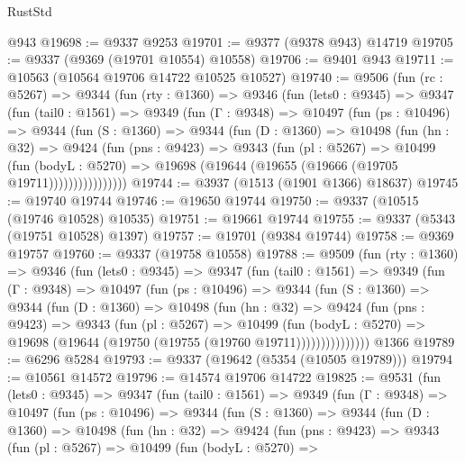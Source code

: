 \begin{lexlean}{RustStd}
\begin{coremodule}
    @943
@19698 := @9337 @9253
@19701 := @9377 (@9378 @943) @14719
@19705 := @9337 (@9369 (@19701 @10554) @10558)
@19706 := @9401 @943
@19711 := @10563 (@10564 @19706 @14722 @10525 @10527)
@19740 := @9506
    (fun (rc : @5267) =>
    @9344
      (fun (rty : @1360) =>
      @9346
        (fun (lets0 : @9345) =>
        @9347
          (fun (tail0 : @1561) =>
          @9349
            (fun (Γ : @9348) =>
            @10497
              (fun (ps : @10496) =>
              @9344
                (fun (S : @1360) =>
                @9344
                  (fun (D : @1360) =>
                  @10498
                    (fun (hn : @32) =>
                    @9424
                      (fun (pns : @9423) =>
                      @9343
                        (fun (pl : @5267) =>
                        @10499
                          (fun (bodyL : @5270) =>
                          @19698 (@19644 (@19655 (@19666 (@19705 @19711))))))))))))))))
@19744 := @3937 (@1513 (@1901 @1366) @18637)
@19745 := @19740 @19744
@19746 := @19650 @19744
@19750 := @9337 (@10515 (@19746 @10528) @10535)
@19751 := @19661 @19744
@19755 := @9337 (@5343 (@19751 @10528) @1397)
@19757 := @19701 (@9384 @19744)
@19758 := @9369 @19757
@19760 := @9337 (@19758 @10558)
@19788 := @9509
    (fun (rty : @1360) =>
    @9346
      (fun (lets0 : @9345) =>
      @9347
        (fun (tail0 : @1561) =>
        @9349
          (fun (Γ : @9348) =>
          @10497
            (fun (ps : @10496) =>
            @9344
              (fun (S : @1360) =>
              @9344
                (fun (D : @1360) =>
                @10498
                  (fun (hn : @32) =>
                  @9424
                    (fun (pns : @9423) =>
                    @9343
                      (fun (pl : @5267) =>
                      @10499
                        (fun (bodyL : @5270) =>
                        @19698 (@19644 (@19750 (@19755 (@19760 @19711)))))))))))))))
    @1366
@19789 := @6296 @5284
@19793 := @9337 (@19642 (@5354 (@10505 @19789)))
@19794 := @10561 @14572
@19796 := @14574 @19706 @14722
@19825 := @9531
    (fun (lets0 : @9345) =>
    @9347
      (fun (tail0 : @1561) =>
      @9349
        (fun (Γ : @9348) =>
        @10497
          (fun (ps : @10496) =>
          @9344
            (fun (S : @1360) =>
            @9344
              (fun (D : @1360) =>
              @10498
                (fun (hn : @32) =>
                @9424
                  (fun (pns : @9423) =>
                  @9343
                    (fun (pl : @5267) =>
                    @10499
                      (fun (bodyL : @5270) =>

\end{coremodule}
\end{lexlean}
